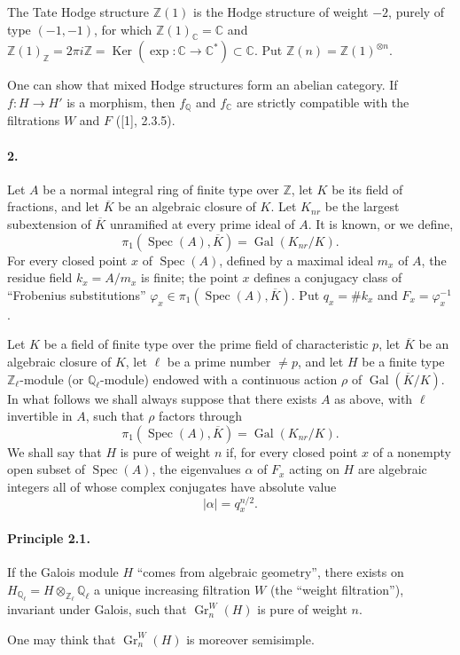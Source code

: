 \documentclass[10pt]{article}
\newcommand{\C}{\mathbb C}
\newcommand{\Q}{\mathbb Q}
\newcommand{\Z}{\mathbb Z}
\newcommand{\Ql}{\mathbb Q_\ell}
\newcommand{\Zl}{\mathbb Z_\ell}
\newcommand{\Gr}{\operatorname{Gr}}
\newcommand{\Gal}{\operatorname{Gal}}
\newcommand{\Spec}{\operatorname{Spec}}
\newcommand{\Ker}{\operatorname{Ker}}
\newcommand{\barK}{\overline{K}}
\begin{document}
The Tate Hodge structure $\Z(1)$ is the Hodge structure of weight $-2$, purely of type $(-1,-1)$, for which $\Z(1)_\C=\C$ and $\Z(1)_\Z=2\pi i\Z=\Ker(\exp:\C\to\C^*)\subset\C$. Put $\Z(n)=\Z(1)^{\otimes n}$.

One can show that mixed Hodge structures form an abelian category. If $f:H\to H'$ is a morphism, then $f_\Q$ and $f_\C$ are strictly compatible with the filtrations $W$ and $F$ ([1], 2.3.5).

\paragraph{2.} Let $A$ be a normal integral ring of finite type over $\Z$, let $K$ be its field of fractions, and let $\barK$ be an algebraic closure of $K$. Let $K_{nr}$ be the largest subextension of $\barK$ unramified at every prime ideal of $A$. It is known, or we define,
\[
\pi_1(\Spec(A),\barK)=\Gal(K_{nr}/K).
\]
For every closed point $x$ of $\Spec(A)$, defined by a maximal ideal $m_x$ of $A$, the residue field $k_x=A/m_x$ is finite; the point $x$ defines a conjugacy class of ``Frobenius substitutions'' $\varphi_x\in\pi_1(\Spec(A),\barK)$. Put $q_x=\#k_x$ and $F_x=\varphi_x^{-1}$.

Let $K$ be a field of finite type over the prime field of characteristic $p$, let $\barK$ be an algebraic closure of $K$, let $\ell$ be a prime number $\ne p$, and let $H$ be a finite type $\Zl$-module (or $\Ql$-module) endowed with a continuous action $\rho$ of $\Gal(\barK/K)$. In what follows we shall always suppose that there exists $A$ as above, with $\ell$ invertible in $A$, such that $\rho$ factors through
\[
\pi_1(\Spec(A),\barK)=\Gal(K_{nr}/K).
\]
We shall say that $H$ is pure of weight $n$ if, for every closed point $x$ of a nonempty open subset of $\Spec(A)$, the eigenvalues $\alpha$ of $F_x$ acting on $H$ are algebraic integers all of whose complex conjugates have absolute value
\[
|\alpha|=q_x^{n/2}.
\]

\paragraph{Principle 2.1.} If the Galois module $H$ ``comes from algebraic geometry'', there exists on $H_{\Ql}=H\otimes_{\Zl}\Ql$ a unique increasing filtration $W$ (the ``weight filtration''), invariant under Galois, such that $\Gr_n^W(H)$ is pure of weight $n$.

One may think that $\Gr_n^W(H)$ is moreover semisimple.
\end{document}

